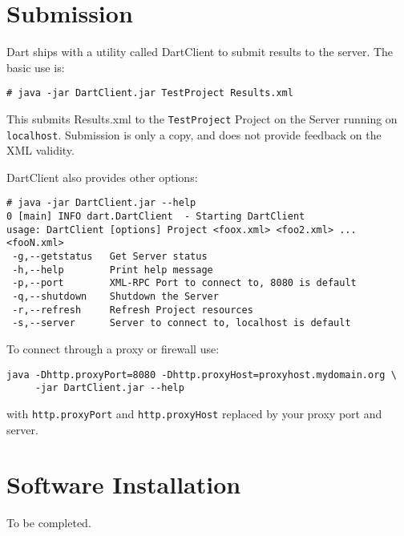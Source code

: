 \documentclass{InsightBook}
\begin{document}
\section{Submission}
Dart ships with a utility called DartClient to submit results to the
server.  The basic use is:
\begin{verbatim}
# java -jar DartClient.jar TestProject Results.xml
\end{verbatim}

This submits Results.xml to the \texttt{TestProject} Project on the
Server running on \texttt{localhost}.  Submission is only a copy, and
does not provide feedback on the XML validity.

DartClient also provides other options:
\begin{verbatim}
# java -jar DartClient.jar --help
0 [main] INFO dart.DartClient  - Starting DartClient
usage: DartClient [options] Project <foox.xml> <foo2.xml> ... <fooN.xml>
 -g,--getstatus   Get Server status
 -h,--help        Print help message
 -p,--port        XML-RPC Port to connect to, 8080 is default
 -q,--shutdown    Shutdown the Server
 -r,--refresh     Refresh Project resources
 -s,--server      Server to connect to, localhost is default
\end{verbatim}

To connect through a proxy or firewall use:
\begin{verbatim}
java -Dhttp.proxyPort=8080 -Dhttp.proxyHost=proxyhost.mydomain.org \
     -jar DartClient.jar --help
\end{verbatim}
with \texttt{http.proxyPort} and \texttt{http.proxyHost} replaced by
your proxy port and server.

\section{Software Installation}
To be completed.
\end{document}
